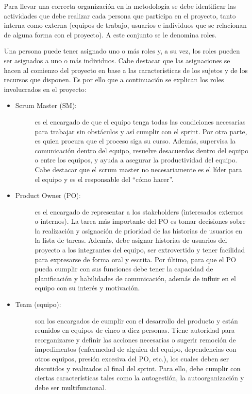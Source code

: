 Para llevar una correcta organización en la metodología se debe identificar las actividades que debe realizar cada persona que participa en el proyecto, tanto interna como externa (equipos de trabajo, usuarios e individuos que se relacionan de alguna forma con el proyecto). A este conjunto se le denomina roles.

Una persona puede tener asignado uno o más roles y, a su vez, los roles pueden ser asignados a uno o más individuos. Cabe destacar que las asignaciones se hacen al comienzo del proyecto en base a las características de los sujetos y de los recursos que disponen. Es por ello que a continuación se explican los roles involucrados en el proyecto:

\begin{itemize}
    \item   \begin{description}
                \item[Scrum Master (SM):] es el encargado de que el equipo tenga todas las condiciones necesarias para trabajar sin obstáculos y así cumplir con el sprint. Por otra parte, es quien procura que el proceso siga su curso. Además, supervisa la comunicación dentro del equipo, resuelve desacuerdos dentro del equipo o entre los equipos, y ayuda a asegurar la productividad del equipo. Cabe destacar que el scrum master no necesariamente es el líder para el equipo y es el responsable del ``cómo hacer''.
            \end{description}    
    
    \item   \begin{description}
                \item[Product Owner (PO):] es el encargado de representar a los stakeholders (interesados externos o internos). La tarea más importante del PO es tomar decisiones sobre la realización y asignación de prioridad de las historias de usuarios en la lista de tareas. Además, debe asignar historias de usuarios del proyecto a los integrantes del equipo, ser extrovertido y tener facilidad para expresarse de forma oral y escrita. Por último, para que el PO pueda cumplir con sus funciones debe tener la capacidad de planificación y habilidades de comunicación, además de influir en el equipo con su interés y motivación.
            \end{description} 
    
    \item   \begin{description}
                \item[Team (equipo):] son los encargados de cumplir con el desarrollo del producto y están reunidos en equipos de cinco a diez personas. Tiene autoridad para reorganizarse y definir las acciones necesarias o sugerir remoción de impedimentos (enfermedad de alguien del equipo, dependencias con otros equipos, presión excesiva del PO, etc.), los cuales deben ser discutidos y realizados al final del sprint. Para ello, debe cumplir con ciertas características tales como la autogestión, la autoorganización y debe ser multifuncional.
            \end{description} 
    

\end{itemize}
